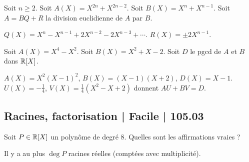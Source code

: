 \begin{question}
Soit $n\ge2$. Soit $A(X) = X^{2n}+X^{2n-2}$. Soit $B(X) = X^{n}+X^{n-1}$. Soit $A = BQ + R$ la division euclidienne de $A$ par $B$. 
\begin{answers}



   
\end{answers}
\begin{explanations}
$Q(X) = X^n-X^{n-1}+2X^{n-2}-2X^{n-3}+\cdots$. $R(X) = \pm 2 X^{n-1}$.
\end{explanations}
\end{question}



\begin{question}
Soit $A(X) = X^4-X^2$. Soit $B(X) = X^2+X-2$.
Soit $D$ le pgcd de $A$ et $B$ dans $\mathbb{R}[X]$.
\begin{answers}



\end{answers}
\begin{explanations}
$A(X)=X^2(X-1)^2$, $B(X)=(X-1)(X+2)$, $D(X)=X-1$. $U(X)= -\frac14$, $V(X)=\frac14(X^2-X+2)$ donnent $AU+BV=D$.
\end{explanations}
\end{question}

\subsection{Racines, factorisation | Facile | 105.03}


\begin{question}
Soit $P \in \mathbb{R}[X]$ un polynôme de degré $8$.
Quelles sont les affirmations vraies ?
\begin{answers}



    
\end{answers}
\begin{explanations}
Il y a au plus $\deg P$ racines réelles (comptées avec multiplicité).
\end{explanations}
\end{question}


